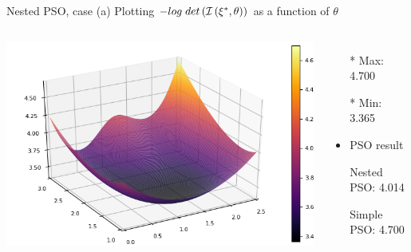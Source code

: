 \documentclass{beamer}
\begin{document}
\begin{frame}{Nested PSO, case (a)}
  Plotting $-log \hspace{1mm} det \left( \mathcal{I} \left( \xi^*,\theta \right) \right)$ as a function of $\theta$\\
  \begin{columns}
    \begin{center}
      \includegraphics[scale=0.5]{surfacea.png}
    \end{center}
    \begin{itemize}
      \item[*] Max: 4.700
      \item[*] Min: 3.365
      \vspace{5mm}
      \item PSO result
      \item[] Nested PSO:  4.014
      \item[] Simple PSO: 4.700
    \end{itemize}
  \end{columns}
\end{frame}
\end{document}
